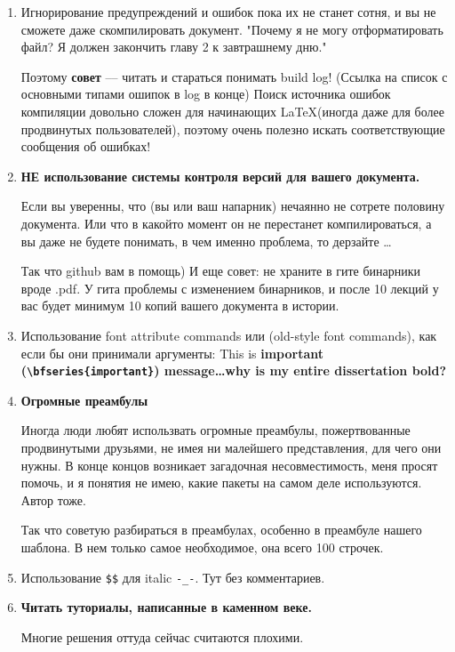 \begin{enumerate}
	\item Игнорирование предупреждений и ошибок пока их не станет сотня, и вы не сможете даже скомпилировать документ. "Почему я не могу отформатировать файл? Я должен закончить главу 2 к завтрашнему дню."
	
	Поэтому  \textbf{совет} –– читать и стараться понимать build log! (Ссылка на список с основными типами ошипок в log в конце)
	Поиск источника ошибок компиляции довольно сложен для начинающих \LaTeX (иногда даже для более продвинутых пользователей), поэтому очень полезно искать соответствующие сообщения об ошибках!
	
	\item \textbf{НЕ использование системы контроля версий для вашего документа.}
	
	Если вы уверенны, что (вы или ваш напарник) нечаянно не сотрете половину документа. 
	Или что в какойто момент он не перестанет компилироваться, а вы даже не будете понимать, в чем именно проблема, то дерзайте \ldots 
	
	Так что github вам в помощь) И еще совет: не храните в гите бинарники вроде .pdf. У гита проблемы с изменением бинарников, и после 10 лекций у вас будет минимум 10 копий вашего документа в истории. 
	
	\item Использование font attribute commands или (old-style font commands), как если бы они принимали аргументы: This is {\bfseries{important} (\verb|\bfseries{important}|) message\ldots why is my entire dissertation bold?}
	
	\item \textbf{Огромные преамбулы}
	
	Иногда люди любят использвать огромные преамбулы, пожертвованные продвинутыми друзьями, не имея ни малейшего представления, для чего они нужны. В конце концов возникает загадочная несовместимость, меня просят помочь, и я понятия не имею, какие пакеты на самом деле используются. Автор тоже.
	
	Так что советую разбираться в преамбулах, особенно в преамбуле нашего шаблона. В нем только самое необходимое, она всего 100 строчек.
	
	\item Использование \verb|$$| для italic \verb|-_-|.  Тут без комментариев.
	
	\item \textbf{Читать туториалы, написанные в каменном веке.}
	
	Многие решения оттуда сейчас считаются плохими.
	
\end{enumerate}                         
